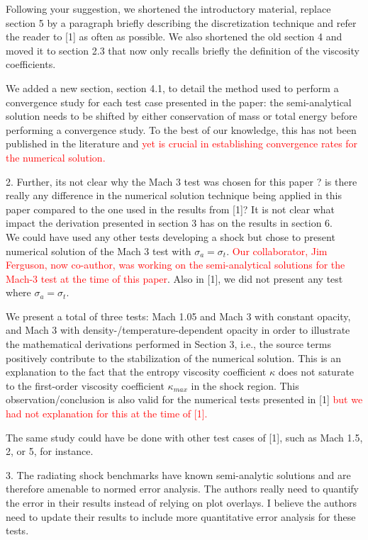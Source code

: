 \documentclass{article}
\newcommand{\tcr}[1]{\textcolor{red}{#1}}
\begin{document}
Following your suggestion, we shortened the introductory material, replace section 5 by a paragraph briefly describing the discretization technique and refer the reader to [1] as often as possible. We also shortened the old section 4 and moved it to section 2.3 that now only recalls briefly the definition of the viscosity coefficients. 

We added a new section, section 4.1, to detail the method used to perform a convergence study for each test case presented in the paper: the semi-analytical solution needs to be shifted by either conservation of mass or total energy before performing a convergence study. To the best of our knowledge, this has not been published in the literature and \tcr{yet is crucial in
establishing convergence rates for the numerical solution.  }
\bigskip

{\color{blue}
2. Further, its not clear why the Mach 3 test was chosen for this paper ? is there really any difference in the numerical solution technique being applied in this paper compared to the one used in the results from [1]? It is not clear what impact the derivation presented in section 3 has on the results in section 6.\\}
We could have used any other tests developing a shock but chose to present numerical solution of the Mach 3 test with $\sigma_a = \sigma_t$. \tcr{Our collaborator, Jim Ferguson, now co-author, was working on the semi-analytical solutions for the Mach-3 test at the time of this paper}. Also in [1], we did not present any test where $\sigma_a = \sigma_t$. 

We present a total of three tests: Mach 1.05 and Mach 3 with constant opacity, and Mach 3 with density-/temperature-dependent opacity in order to illustrate the mathematical derivations performed in Section 3, i.e., the source terms positively contribute to the stabilization of the numerical solution. This is an explanation to the fact that the entropy viscosity coefficient $\kappa$ does not saturate to the first-order viscosity coefficient $\kappa_{max}$ in the shock region. This observation/conclusion is also valid for the numerical tests presented in [1] \tcr{but we had not explanation for this at the time of [1].}

The same study could have be done with other test cases of [1], such as Mach 1.5, 2, or 5, for instance. 
\bigskip

{\color{blue}
3. 
The radiating shock benchmarks have known semi-analytic solutions and are therefore amenable to normed error analysis. The authors really need to quantify the error in their results instead of relying on plot overlays. I believe the authors need to update their results to include more quantitative error analysis for these tests.
\\}
\end{document}
